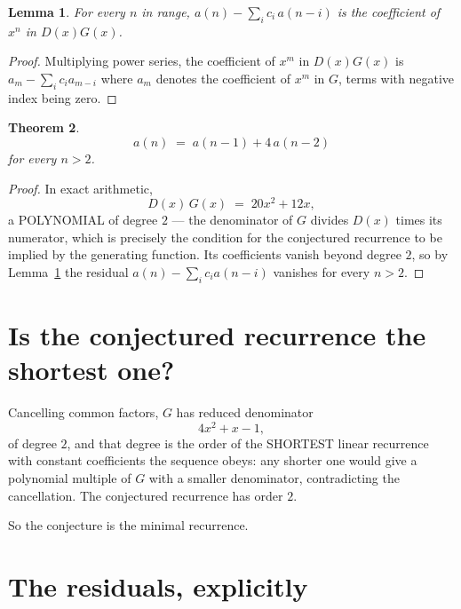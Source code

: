 \documentclass[11pt,a4paper]{article}
\theoremstyle{plain}
\newtheorem{theorem}{Theorem}
\newtheorem{lemma}[theorem]{Lemma}
\theoremstyle{definition}
\begin{document}
\begin{lemma}\label{lem:key}
For every $n$ in range, $a(n)-\sum_i c_i\,a(n-i)$ is the coefficient of $x^{n}$ in
$D(x)G(x)$.
\end{lemma}

\begin{proof}
Multiplying power series, the coefficient of $x^{m}$ in $D(x)G(x)$ is
$a_m-\sum_i c_i a_{m-i}$ where $a_m$ denotes the coefficient of $x^{m}$ in $G$, terms with
negative index being zero.
\end{proof}

\begin{theorem}
\[
a(n)\;=\;a(n-1) + 4\,a(n-2)
\]
for every $n>2$.
\end{theorem}

\begin{proof}
In exact arithmetic,
\[
D(x)\,G(x)\;=\;20 x^{2} + 12 x,
\]
a POLYNOMIAL of degree $2$ --- the denominator of $G$ divides $D(x)$ times its numerator,
which is precisely the condition for the conjectured recurrence to be implied by the
generating function. Its coefficients vanish beyond degree $2$, so by
Lemma~\ref{lem:key} the residual $a(n)-\sum_ic_ia(n-i)$ vanishes for every
$n>2$.
\end{proof}

\section{Is the conjectured recurrence the shortest one?}

Cancelling common factors, $G$ has reduced denominator
\[
4 x^{2} + x - 1,
\]
of degree $2$, and that degree is the order of the SHORTEST linear recurrence with
constant coefficients the sequence obeys: any shorter one would give a polynomial multiple of
$G$ with a smaller denominator, contradicting the cancellation. The conjectured recurrence has
order $2$.

So the conjecture is the minimal recurrence.

\section{The residuals, explicitly}
\end{document}
